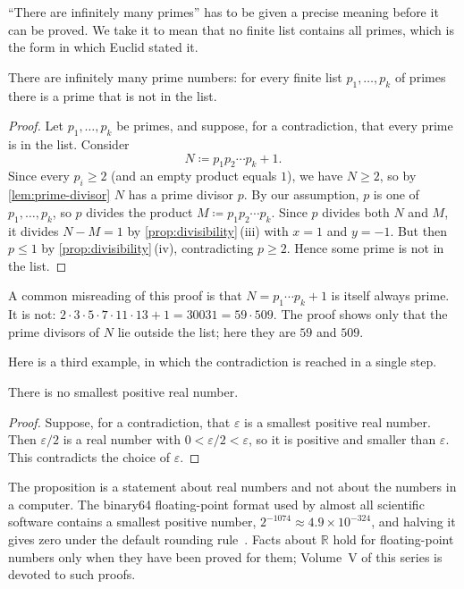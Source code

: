 ``There are infinitely many primes'' has to be given a precise meaning before it can be proved. We take it to mean that no finite list contains all primes, which is the form in which Euclid stated it.

\begin{theorem}[Euclid]
\label{thm:euclid}
There are infinitely many prime numbers: for every finite list $p_1,\ldots,p_k$ of primes there is a prime that is not in the list.
\end{theorem}

\begin{proof}
Let $p_1,\ldots,p_k$ be primes, and suppose, for a contradiction, that every prime is in the list. Consider
\[
N\coloneqq p_1p_2\cdots p_k+1 .
\]
Since every $p_i\ge2$ (and an empty product equals $1$), we have $N\ge2$, so by \cref{lem:prime-divisor} $N$ has a prime divisor $p$. By our assumption, $p$ is one of $p_1,\ldots,p_k$, so $p$ divides the product $M\coloneqq p_1p_2\cdots p_k$. Since $p$ divides both $N$ and $M$, it divides $N-M=1$ by \cref{prop:divisibility}\,(iii) with $x=1$ and $y=-1$. But then $p\le1$ by \cref{prop:divisibility}\,(iv), contradicting $p\ge2$. Hence some prime is not in the list.
\end{proof}

A common misreading of this proof is that $N=p_1\cdots p_k+1$ is itself always prime. It is not: $2\cdot3\cdot5\cdot7\cdot11\cdot13+1=30031=59\cdot509$. The proof shows only that the prime divisors of $N$ lie outside the list; here they are $59$ and $509$.

Here is a third example, in which the contradiction is reached in a single step.

\begin{proposition}
\label{prop:no-smallest}
There is no smallest positive real number.
\end{proposition}

\begin{proof}
Suppose, for a contradiction, that $\varepsilon$ is a smallest positive real number. Then $\varepsilon/2$ is a real number with $0<\varepsilon/2<\varepsilon$, so it is positive and smaller than $\varepsilon$. This contradicts the choice of $\varepsilon$.
\end{proof}

The proposition is a statement about real numbers and not about the numbers in a computer. The binary64 floating-point format used by almost all scientific software contains a smallest positive number, $2^{-1074}\approx4.9\times10^{-324}$, and halving it gives zero under the default rounding rule~\cite{ieee754-2019}. Facts about $\mathbb R$ hold for floating-point numbers only when they have been proved for them; Volume~V of this series is devoted to such proofs.

